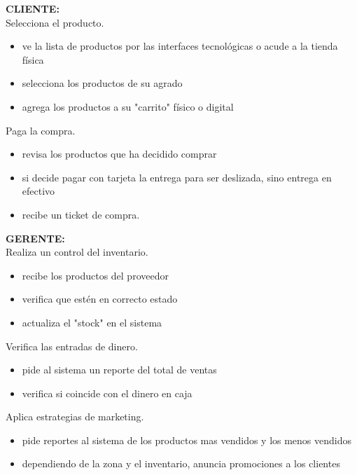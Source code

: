 \documentclass[spanish,12pt,letterpapper]{article}
\begin{document}
	\textbf{CLIENTE:\\}
	Selecciona el producto.
	\begin{itemize}
	\item ve la lista de productos por las interfaces tecnológicas o acude a la tienda física
	\item selecciona los productos de su agrado
	\item agrega los productos a su "carrito" físico o digital\\
	\end{itemize}
	Paga la compra.
	\begin{itemize}
	\item revisa los productos que ha decidido comprar
	\item si decide pagar con tarjeta la entrega para ser deslizada, sino entrega en efectivo
	\item recibe un ticket de compra.\\
	\end{itemize}
	
	\textbf{GERENTE:\\}
	Realiza un control del inventario.
	\begin{itemize}
	\item recibe los productos del proveedor
	\item verifica que estén en correcto estado
	\item actualiza el "stock" en el sistema\\
	\end{itemize}
	Verifica las entradas de dinero.
	\begin{itemize}
	\item pide al sistema un reporte del total de ventas
	\item verifica si coincide con el dinero en caja\\
	\end{itemize}
	Aplica estrategias de marketing.
	\begin{itemize}
	\item pide reportes al sistema de los productos mas vendidos y los menos vendidos
	\item dependiendo de la zona y el inventario, anuncia promociones a los clientes\\
	\end{itemize}
	
\end{document}
